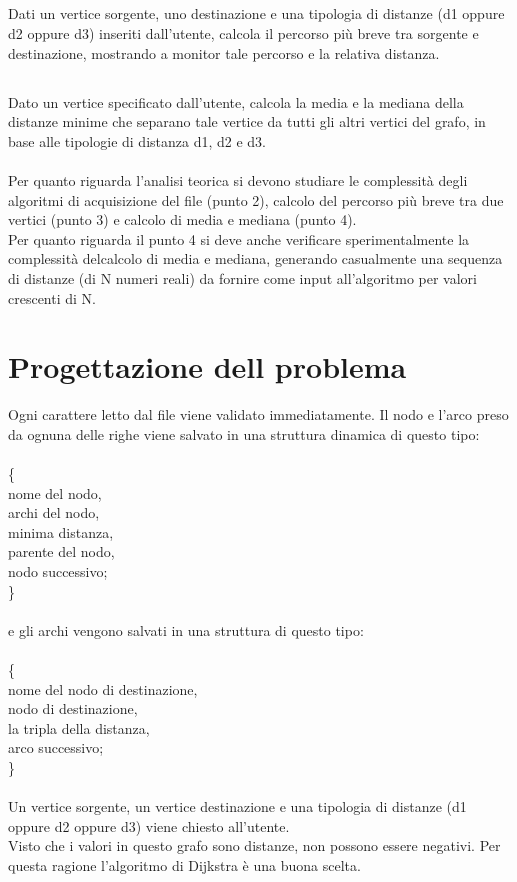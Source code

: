 \documentclass[11pt, a4paper, titlepage, block]{article}
\begin{document}
	\subsection{}
	Dati un vertice sorgente, uno destinazione e una tipologia di distanze (d1 oppure d2 oppure d3) inseriti dall'utente, calcola il percorso pi\`{u} breve tra sorgente e destinazione, mostrando a
monitor tale percorso e la relativa distanza.
	\subsection{}
	Dato un vertice specificato dall'utente, calcola la media e la mediana della distanze minime che separano tale vertice da tutti gli altri vertici del grafo, in base alle tipologie di distanza d1, d2 e d3.\\ \\
	Per quanto riguarda l'analisi teorica si devono studiare le complessit\`{a} degli algoritmi di acquisizione del file (punto 2), calcolo del percorso pi\`{u} breve tra due vertici (punto 3) e calcolo di media e mediana (punto 4).\\
	Per quanto riguarda il punto 4 si deve anche verificare sperimentalmente la complessit\`{a} delcalcolo di media e mediana, generando casualmente una sequenza di distanze (di N numeri reali) da fornire come input all'algoritmo per valori crescenti di N.

	\newpage
\section{Progettazione dell problema}
Ogni carattere letto dal file viene validato immediatamente. Il nodo e l'arco preso da ognuna delle righe viene salvato in una struttura dinamica di questo tipo: \\\\
\{\\
\indent nome del nodo,\\
\indent archi del nodo,\\
\indent minima distanza,\\
\indent parente del nodo,\\
\indent nodo successivo; \\
\}\\\\
e gli archi vengono salvati in una struttura di questo tipo:\\\\
\{\\
\indent nome del nodo di destinazione,\\
\indent nodo di destinazione,\\
\indent la tripla della distanza,\\
\indent arco successivo;\\
\}\\\\
Un vertice sorgente, un vertice destinazione e una tipologia di distanze (d1 oppure d2 oppure d3) viene chiesto all'utente.\\
Visto che i valori in questo grafo sono distanze, non possono essere negativi. Per questa ragione l'algoritmo di Dijkstra \`{e} una buona scelta.\\\\
\end{document}
